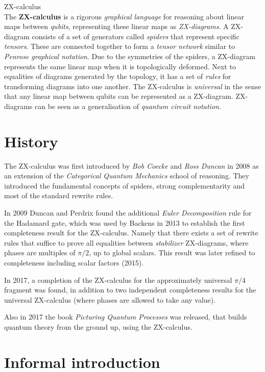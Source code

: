 \documentclass[a4paper, 12pt]{article}
\begin{document}
{\Huge ZX-calculus} \\

The \textbf{ZX-calculus} is a rigorous \emph{graphical language} for reasoning about linear maps between \emph{qubits}, representing these linear maps as \emph{ZX-diagrams}. A ZX-diagram consists of a set of generators called \emph{spiders} that represent specific \emph{tensors}. These are connected together to form a \emph{tensor network} similar to \emph{Penrose graphical notation}. Due to the symmetries of the spiders, a ZX-diagram represents the same linear map when it is topologically deformed. Next to equalities of diagrams generated by the topology, it has a set of \emph{rules} for transforming diagrams into one another. The ZX-calculus is \emph{universal} in the sense that any linear map between qubits can be represented as a ZX-diagram. ZX-diagrams can be seen as a generalisation of \emph{quantum circuit notation}.

\section{History}
The ZX-calculus was first introduced by \emph{Bob Coecke} and \emph{Ross Duncan} in 2008 as an extension of the \emph{Categorical Quantum Mechanics} school of reasoning. They introduced the fundamental concepts of spiders, strong complementarity and most of the standard rewrite rules.

In 2009 Duncan and Perdrix found the additional \emph{Euler Decomposition} rule for the Hadamard gate, which was used by Backens in 2013 to establish the first completeness result for the ZX-calculus. Namely that there exists a set of rewrite rules that suffice to prove all equalities between \emph{stabilizer} ZX-diagrams, where phases are multiples of $\pi/2$, up to global scalars. This result was later refined to completeness including scalar factors (2015).

In 2017, a completion of the ZX-calculus for the approximately universal $\pi/4$ fragment was found, in addition to two independent completeness results for the universal ZX-calculus (where phases are allowed to take any value).

Also in 2017 the book \emph{Picturing Quantum Processes} was released, that builds quantum theory from the ground up, using the ZX-calculus.


\section{Informal introduction}
\end{document}
